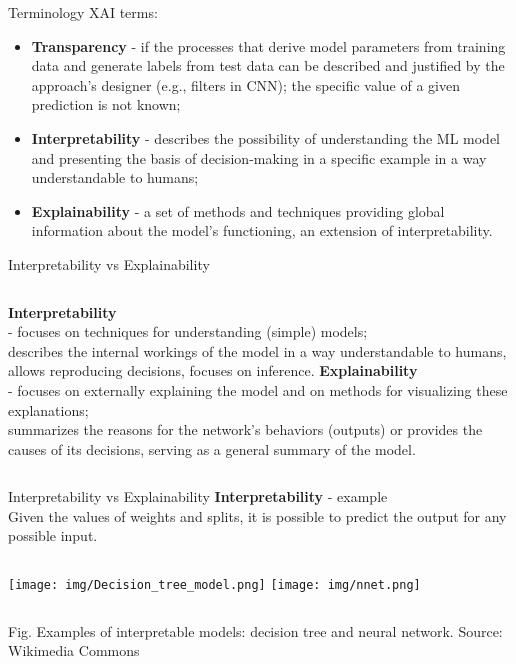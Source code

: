 \documentclass{beamer}
\begin{document}
\begin{frame}{Terminology}
XAI terms:
\begin{itemize}
\item \textbf{Transparency} - if the processes that derive model parameters from training data and generate labels from test data can be described and justified by the approach's designer (e.g., filters in CNN); the specific value of a given prediction is not known;
\item \textbf{Interpretability} - describes the possibility of understanding the ML model and presenting the basis of decision-making in a specific example in a way understandable to humans;
\item \textbf{Explainability} - a set of methods and techniques providing global information about the model's functioning, an extension of interpretability.
\end{itemize}
\end{frame}

\begin{frame}{Interpretability vs Explainability}
\begin{columns}
\textbf{Interpretability} \\
- focuses on techniques for understanding (simple) models; \\
describes the internal workings of the model in a way understandable to humans, allows reproducing decisions, focuses on inference.
\textbf{Explainability} \\
- focuses on externally explaining the model and on methods for visualizing these explanations;\\
summarizes the reasons for the network's behaviors (outputs) or provides the causes of its decisions, serving as a general summary of the model.
\end{columns}
\end{frame}

\begin{frame}{Interpretability vs Explainability}
\textbf{Interpretability} - example\\
Given the values of weights and splits, it is possible to predict the output for any possible input.\\
\begin{center}
\begin{columns}
\texttt{[image: img/Decision\_tree\_model.png]} 
\texttt{[image: img/nnet.png]} 
\end{columns}
\end{center}
\footnotesize{Fig. Examples of interpretable models: decision tree and neural network. Source: Wikimedia Commons}

\end{frame}
\end{document}
